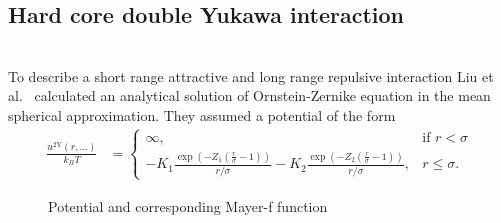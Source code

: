 \subsection{Hard core double Yukawa interaction}~\\
\label{sect:SQ4doubleYukawa}
To describe a short range attractive and long range repulsive interaction Liu et al.\ \cite{Liu2005} calculated an analytical solution of Ornstein-Zernike equation in the mean spherical approximation. They assumed a potential of the form
\begin{align}\label{eq:SQ2Ypotential}
\frac{u^\mathrm{2Y}(r,\ldots)}{k_BT} &= \begin{cases}
                             \infty, & \mbox{if }  r < \sigma \\
                             -K_1\frac{\exp\left(-Z_1 \left(\frac{r}{\sigma}-1\right)\right)}{r/\sigma} -K_2\frac{\exp\left(-Z_2 \left(\frac{r}{\sigma}-1\right)\right)}{r/\sigma}, & r\leq \sigma.
                            \end{cases}
\end{align}
\begin{figure}[htb]
\captionsetup[subfigure]{position=b}
\centering
{}
\hfill
{}
\caption{Potential and corresponding Mayer-f function }
\label{fig:YukawaPot}
\end{figure}

